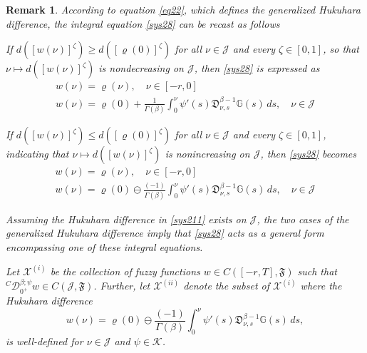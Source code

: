 \documentclass[10pt,a4paper]{amsart}
\numberwithin{equation}{section}
\newtheorem{remark}[theo]{Remark}
\begin{document}
\begin{remark}\label{rq22} \rm
According to equation \eqref{eq22}, which defines the generalized Hukuhara difference, 
the integral equation \eqref{sys28} can be recast as follows

If \(d([ w(\nu )]^{\zeta}) \geq d([\varrho(0)]^{\zeta})\) for all 
\(\nu \in \mathcal{J}\) and every \(\zeta \in [0,1]\), so that 
\(\nu \mapsto d([ w(\nu )]^{\zeta})\) is nondecreasing on \(\mathcal{J}\), 
then \eqref{sys28} is expressed as
\begin{equation} \label{sys210}
\begin{gathered}
 w(\nu ) = \varrho(\nu ), \quad \nu \in [- r, 0] \tag{2.10} \\
 w(\nu ) = \varrho(0) + \frac{1}{\Gamma(\beta)} \int_0^{\nu } \psi'(s)
  \mathfrak{D}_{\nu ,s}^{\beta-1} \mathbb{G}(s) \, ds, \quad \nu \in \mathcal{J}
\end{gathered}
\end{equation}

If \(d([ w(\nu )]^{\zeta}) \leq d([\varrho(0)]^{\zeta})\) for all 
\(\nu \in \mathcal{J}\) and every \(\zeta \in [0,1]\), indicating that 
\(\nu \mapsto d([ w(\nu )]^{\zeta})\) is nonincreasing on \(\mathcal{J}\), 
then \eqref{sys28} becomes
\begin{equation} \label{sys211}
\begin{gathered}
 w(\nu ) = \varrho(\nu ), \quad \nu \in [- r, 0] \tag{2.11} \\
 w(\nu ) = \varrho(0) \ominus \frac{(-1)}{\Gamma(\beta)} \int_0^{\nu }
  \psi'(s) \mathfrak{D}_{\nu ,s}^{\beta-1} \mathbb{G}(s) \, ds, \quad
  \nu \in \mathcal{J}
\end{gathered}
\end{equation}

Assuming the Hukuhara difference in \eqref{sys211} exists on \(\mathcal{J}\), 
the two cases of the generalized Hukuhara difference imply that \eqref{sys28} acts 
as a general form encompassing one of these integral equations.

Let \(\mathcal{X}^{(i)}\) be the collection of fuzzy functions 
\( w \in C([- r, T], \mathfrak{F})\) such that 
\({}^C \mathcal{D}_{0^{+}}^{\beta ; \psi} w \in C(\mathcal{J}, \mathfrak{F})\).
Further, let \(\mathcal{X}^{(ii)}\) denote the subset of \(\mathcal{X}^{(i)}\) 
where the Hukuhara difference
\[
 w(\nu ) = \varrho(0) \ominus \frac{(-1)}{\Gamma(\beta)} \int_0^{\nu } \psi'(s)
 \mathfrak{D}_{\nu ,s}^{\beta-1} \mathbb{G}(s) \, ds,
\]
is well-defined for \(\nu \in \mathcal{J}\) and \(\psi \in \mathcal{K}\).
\end{remark}
\end{document}
